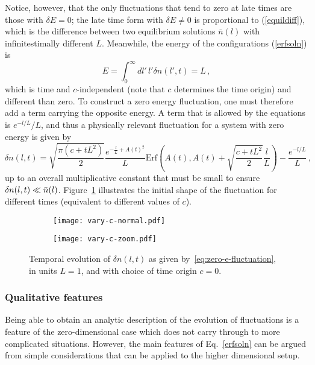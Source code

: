 \documentclass[a4paper,11pt]{article}
\newcommand{\lr}[1]{\left(#1\right)}
\begin{document}
Notice, however, that the only fluctuations that tend to zero at late times 
are those with $\delta E=0$; the late time form with $\delta E\neq 0$ is
proportional to (\ref{equildiff}), which is the difference between two 
equilibrium solutions $\bar n(l)$ with infinitestimally different $L$.
Meanwhile, the energy of the configurations (\ref{erfsoln}) is
\begin{equation}
    E=\int_0^{\infty}{dl' \, l'\delta n(l',t)}=L\, ,
\end{equation}
which is time and $c$-independent (note that $c$ determines the time origin) 
and different than zero. 
To construct a zero energy fluctuation, one must therefore add a term carrying the opposite energy.
A term that is allowed by the equations is $e^{-l/L}/L$, and thus a physically relevant fluctuation for a system with zero energy is given by
\begin{equation}\label{eq:zero-e-fluctuation}
    \delta n(l,t) = \sqrt{\frac{\pi(c+t L^2)}{2}}\frac{e^{-\frac{l}{L}+A(t)^2}}{L}\text{Erf}\lr{A(t),A(t)+\sqrt{\frac{c+t L^2}{2}}\frac{l}{L}}-\frac{e^{-l/L}}{L} \, ,
\end{equation}
up to an overall multiplicative constant that must be small to ensure $\delta n(l,t)\ll \Bar{n}(l)$.
Figure~\ref{fig:icfluctuation} illustrates the initial shape of the fluctuation for different times (equivalent
to different values of $c$).

\begin{figure}
     \centering
     \begin{subfigure}[b]{0.45\linewidth}
         \centering
         \texttt{[image: vary-c-normal.pdf]}
     \end{subfigure}
     \hfill
     \begin{subfigure}[b]{0.45\textwidth}
         \centering
         \texttt{[image: vary-c-zoom.pdf]}
     \end{subfigure}
        \caption{Temporal evolution of $\delta n(l,t)$ as given by~\eqref{eq:zero-e-fluctuation}, in units $L=1$, and with choice of time origin $c=0$.}
        \label{fig:icfluctuation}
\end{figure}

\subsubsection*{Qualitative features}
Being able to obtain an analytic description of the evolution of fluctuations is a feature of the zero-dimensional case which does not carry through to more complicated situations.
However, the main features of Eq.~\eqref{erfsoln} can be argued from simple considerations that can be applied to the higher dimensional setup.
\end{document}

